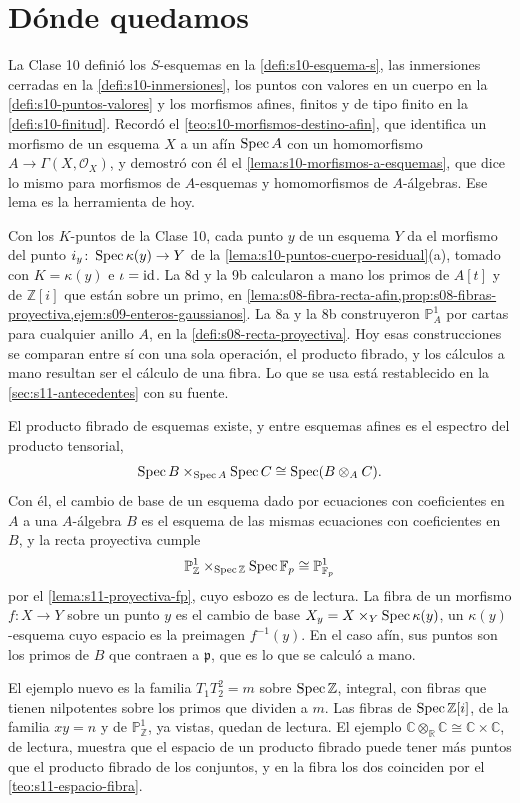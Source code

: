 \section{Dónde quedamos}
\label{sec:s11-donde-quedamos}

La Clase 10 definió los \(S\)-esquemas en la \cref{defi:s10-esquema-s}, las inmersiones cerradas en la \cref{defi:s10-inmersiones}, los puntos con valores en un cuerpo en la \cref{defi:s10-puntos-valores} y los morfismos afines, finitos y de tipo finito en la \cref{defi:s10-finitud}. Recordó el \cref{teo:s10-morfismos-destino-afin}, que identifica un morfismo de un esquema \(X\) a un afín \(\operatorname{Spec} A\) con un homomorfismo \(A\to\Gamma(X,\mathcal O_X)\), y demostró con él el \cref{lema:s10-morfismos-a-esquemas}, que dice lo mismo para morfismos de \(A\)-esquemas y homomorfismos de \(A\)-álgebras. Ese lema es la herramienta de hoy.

Con los \(K\)-puntos de la Clase 10, cada punto \(y\) de un esquema \(Y\) da el morfismo del punto \(i_y\colon\operatorname{Spec}\kappa(y)\to Y\) de la \cref{lema:s10-puntos-cuerpo-residual}(a), tomado con \(K=\kappa(y)\) e \(\iota=\operatorname{id}\). La 8d y la 9b calcularon a mano los primos de \(A[t]\) y de \(\mathbb Z[i]\) que están sobre un primo, en \cref{lema:s08-fibra-recta-afin,prop:s08-fibras-proyectiva,ejem:s09-enteros-gaussianos}. La 8a y la 8b construyeron \(\mathbb P_A^1\) por cartas para cualquier anillo \(A\), en la \cref{defi:s08-recta-proyectiva}. Hoy esas construcciones se comparan entre sí con una sola operación, el producto fibrado, y los cálculos a mano resultan ser el cálculo de una fibra. Lo que se usa está restablecido en la \cref{sec:s11-antecedentes} con su fuente.

\begin{obs}
\label{obs:s11-objetivos}
El producto fibrado de esquemas existe, y entre esquemas afines es el espectro del producto tensorial,
\[
 \operatorname{Spec} B\times_{\operatorname{Spec} A}\operatorname{Spec} C\cong\operatorname{Spec}(B\otimes_A C).
\]
Con él, el cambio de base de un esquema dado por ecuaciones con coeficientes en \(A\) a una \(A\)-álgebra \(B\) es el esquema de las mismas ecuaciones con coeficientes en \(B\), y la recta proyectiva cumple
\[
 \mathbb P_{\mathbb Z}^1\times_{\operatorname{Spec}\mathbb Z}\operatorname{Spec}\mathbb F_p\cong\mathbb P_{\mathbb F_p}^1
\]
por el \cref{lema:s11-proyectiva-fp}, cuyo esbozo es de lectura. La fibra de un morfismo \(f\colon X\to Y\) sobre un punto \(y\) es el cambio de base \(X_y=X\times_Y\operatorname{Spec}\kappa(y)\), un \(\kappa(y)\)-esquema cuyo espacio es la preimagen \(f^{-1}(y)\). En el caso afín, sus puntos son los primos de \(B\) que contraen a \(\mathfrak p\), que es lo que se calculó a mano.

El ejemplo nuevo es la familia \(T_1T_2^2=m\) sobre \(\operatorname{Spec}\mathbb Z\), integral, con fibras que tienen nilpotentes sobre los primos que dividen a \(m\). Las fibras de \(\operatorname{Spec}\mathbb Z[i]\), de la familia \(xy=n\) y de \(\mathbb P^1_{\mathbb Z}\), ya vistas, quedan de lectura. El ejemplo \(\mathbb C\otimes_{\mathbb R}\mathbb C\cong\mathbb C\times\mathbb C\), de lectura, muestra que el espacio de un producto fibrado puede tener más puntos que el producto fibrado de los conjuntos, y en la fibra los dos coinciden por el \cref{teo:s11-espacio-fibra}.
\end{obs}

